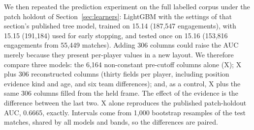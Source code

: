 We then repeated the prediction experiment on the full labelled corpus under the patch holdout of
Section~\ref{sec:learners}: LightGBM with the settings of that section's published tree model, trained on
15.14 (187,547 engagements), with 15.15 (191,184) used for early stopping, and tested once on 15.16
(153,816 engagements from 55,449 matches). Adding 306 columns could raise the AUC merely because they present
per-player values in a new layout. We therefore compare three models: the 6,164 non-constant pre-cutoff
columns alone (X); X plus 306 reconstructed columns (thirty fields per player, including position
evidence kind and age, and six team differences); and, as a control, X plus the same 306 columns filled
from the held frame. The effect of the evidence is the difference between the last two. X alone
reproduces the published patch-holdout AUC, 0.6665, exactly. Intervals come from 1,000 bootstrap
resamples of the test matches, shared by all models and bands, so the differences are paired.

